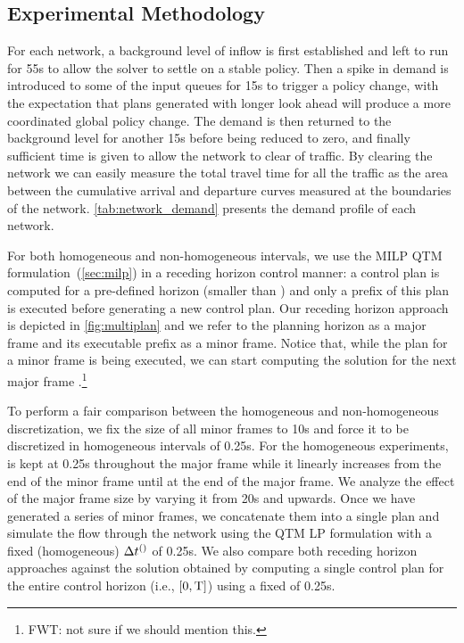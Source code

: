 \subsection{Experimental Methodology}

For each network, a background level of inflow is first established and left to
run for 55s to allow the solver to settle on a stable policy. Then a spike in
demand is introduced to some of the input queues for 15s to trigger a policy
change, with the expectation that plans generated with longer look ahead will
produce a more coordinated global policy change. The demand is then returned to
the background level for another 15s before being reduced to zero, and finally
sufficient time is given to allow the network to clear of traffic. By clearing
the network we can easily measure the total travel time for all the traffic as
the area between the cumulative arrival and departure curves measured at the
boundaries of the network. \cref{tab:network_demand} presents the demand profile
of each network.


For both homogeneous and non-homogeneous intervals, we use the MILP QTM
formulation~(\cref{sec:milp}) in a receding horizon control manner: a control
plan is computed for a pre-defined horizon (smaller than \TMAX) and only a
prefix of this plan is executed before generating a new control plan. 
%
Our receding horizon approach is depicted in \cref{fig:multiplan} and we refer
to the planning horizon as a major frame and its executable prefix as a minor
frame.
%
Notice that, while the plan for a minor frame is being executed, we can start
computing the solution for the next major frame .\footnote{FWT: not sure if we should mention this.}


To perform a fair comparison between the homogeneous and non-homogeneous
discretization, we fix the size of all minor frames to 10s and force it to be
discretized in homogeneous intervals of 0.25s.
%
For the homogeneous experiments, \DT[] is kept at 0.25s throughout the major
frame while it linearly increases from the end of the minor frame until at the
end of the major frame.
%
We analyze the effect of the major frame size by varying it from 20s and
upwards.
%
Once we have generated a series of minor frames, we concatenate them into a
single plan and simulate the flow through the network using the QTM LP
formulation with a fixed (homogeneous) $\DT[]$ of 0.25s.
%
%
We also compare both receding horizon approaches against the 
solution obtained by computing a single control plan for the entire control
horizon (i.e., $[0,\TMAX]$) using a fixed \DT[] of 0.25s.



